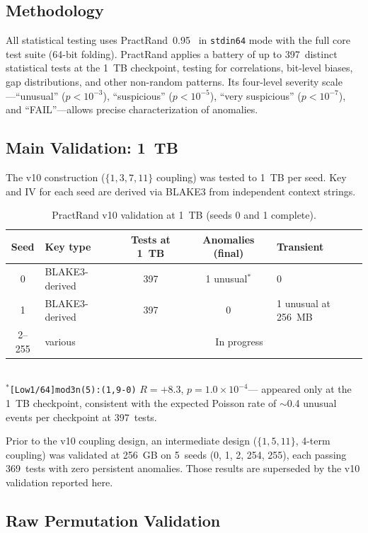 \documentclass[runningheads]{llncs}
\begin{document}
\subsection{Methodology}

All statistical testing uses PractRand~0.95~\cite{practrand} in \texttt{stdin64}
mode with the full core test suite (64-bit folding).  PractRand applies a
battery of up to 397~distinct statistical tests at the 1~TB checkpoint,
testing for correlations, bit-level biases, gap distributions, and other
non-random patterns.  Its four-level severity scale---``unusual'' ($p < 10^{-3}$),
``suspicious'' ($p < 10^{-5}$), ``very suspicious'' ($p < 10^{-7}$), and
``FAIL''---allows precise characterization of anomalies.

\subsection{Main Validation: 1~TB}

The v10 construction ($\{1,3,7,11\}$ coupling) was tested to 1~TB per seed.
Key and IV for each seed are derived via BLAKE3 from independent context strings.

\begin{table}[h]
\centering
\caption{PractRand v10 validation at 1~TB (seeds 0 and 1 complete).}
\label{tab:practrand-1tb}
\begin{tabular}{@{}clccl@{}}
\toprule
Seed & Key type & Tests at 1~TB & Anomalies (final) & Transient \\
\midrule
0 & BLAKE3-derived & 397 & 1 unusual$^*$ & 0 \\
1 & BLAKE3-derived & 397 & 0 & 1 unusual at 256~MB \\
2--255 & various & \multicolumn{3}{c}{In progress} \\
\bottomrule
\end{tabular}
\\[4pt]
{\footnotesize $^*$\texttt{[Low1/64]mod3n(5):(1,9-0)} $R = +8.3$, $p = 1.0 \times 10^{-4}$---
appeared only at the 1~TB checkpoint, consistent with the expected
Poisson rate of $\sim$0.4 unusual events per checkpoint at 397~tests.}
\end{table}

Prior to the v10 coupling design, an intermediate design ($\{1,5,11\}$, 4-term
coupling) was validated at 256~GB on 5~seeds (0, 1, 2, 254, 255), each passing
369~tests with zero persistent anomalies.  Those results are superseded by the
v10 validation reported here.

\subsection{Raw Permutation Validation}
\end{document}
